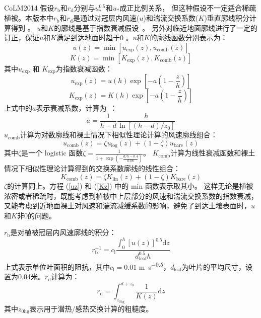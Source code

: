CoLM2014 假设$r_{\mathrm {b}}$和$r_{\mathrm {d}}$分别与$u_\ast^{0.5}$和$u_\ast$成正比例关系，
但这种假设不一定适合稀疏植被。本版本中$r_{\mathrm {b}}$和$r_{\mathrm {d}}$是通过对冠层内风速($u$)和湍流交换系数($K$)垂直廓线积分计算得到 \citep{dai2019different}。
$u$和$K$的廓线是基于指数衰减假设~\citep{inoue1963turbulent,cowan1968mass}。
另外对临近地面廓线进行了一定的订正，保证$u$和$K$满足到达地面时趋于0 \citep{dai2019different}。$u$和$K$的廓线函数分别表示为：
\begin{equation}\label{uz}
  u(z)=\min \left[u_{\mathrm{exp}}(z), u_{\mathrm{comb}}(z)\right]
\end{equation}
\begin{equation}\label{Kz}
  K(z)=\min \left[K_{\mathrm{exp}}(z), K_{\mathrm{comb}}(z)\right]
\end{equation}
其中$u_{\mathrm{exp}}$ 和 $K_{\mathrm{exp}}$为指数衰减函数：
\begin{equation}
  u_{\mathrm{exp}}(z)=u(h) \exp \left[-a\left(1-\frac{z}{h}\right)\right]
\end{equation}
\begin{equation}
  K_{\mathrm{exp}}(z)=K(h) \exp \left[-a\left(1-\frac{z}{h}\right)\right]
\end{equation}
上式中的$a$表示衰减系数，计算为~\citep{inoue1963turbulent,cowan1968mass,kondo1971relationship}：
\begin{equation}
  a=\frac{1}{h-d} \frac{h}{\ln \left[(h-d) / z_{0}\right]}
\end{equation}
$u_{\mathrm{comb}}$计算为对数廓线和裸土情况下相似性理论计算的风速廓线组合：
\begin{equation}\label{ucomb}
  u_{\mathrm{comb}}(z)=\zeta u_{\mathrm{\log }}(z)+(1-\zeta) u_{\mathrm{{bare }}}(z)
\end{equation}
其中$\zeta$是一个 logistic 函数$\zeta=\frac{1}{1+\exp{\left(-\frac{d/h-0.4}{0.08}\right)}}$。
$K_{\mathrm{comb}}$计算为线性衰减函数和裸土情况下相似性理论计算得到的交换系数廓线的线性组合：
\begin{equation}\label{kcomb}
  K_{\mathrm{comb}}(z)=\zeta K_{\mathrm{\mathrm{lin}}}(z)+(1-\zeta) K_{\mathrm{bare}}(z)
\end{equation}
$\zeta$的计算同上。方程 (\ref{uz}) 和 (\ref{Kz}) 中的 min 函数表示取其小。
这样无论是植被浓密或者稀疏时，既能考虑到植被中上层部分的风速和湍流交换系数的指数衰减，
又能考虑到近地面裸土对风速和湍流减缓系数的影响，避免了到达土壤表面时，$u$和$K$非0的问题。


$r_{\mathrm {b}}$是对植被冠层内风速廓线的积分：
\begin{equation}
  r_{\mathrm{b}}^{-1}=c_{\mathrm{l}} \frac{\int_{0}^{h}[u(z)]^{0.5} {\mathrm d} z}{d_{\mathrm{leaf}}^{0.5} h}
\end{equation}
上式表示单位叶面积的阻抗，其中$c_{\mathrm {l}}=0.01$ \unit{m.s^{-0.5}}，$d_{\mathrm{leaf}}$为叶片的平均尺寸，设置为0.04米。$r_{\mathrm {d}}$计算为：
\begin{equation}\label{r_d1}
  r_{\mathrm{d}}=\int_{z_{0 \mathrm{hg}}}^{d+z_{0}} \frac{1}{K(z)} {\mathrm d} z
\end{equation}
其中$z_{\mathrm{0hg}}$表示用于潜热/感热交换计算的粗糙度\citep{zeng1998effect}。

